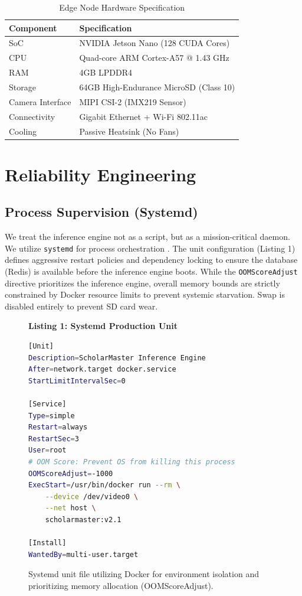 \documentclass[conference]{IEEEtran}
\begin{document}
\begin{table}[htbp]
\caption{Edge Node Hardware Specification}
\begin{center}
\begin{tabular}{ll}
\toprule
\textbf{Component} & \textbf{Specification} \\
\midrule
SoC & NVIDIA Jetson Nano (128 CUDA Cores) \\
CPU & Quad-core ARM Cortex-A57 @ 1.43 GHz \\
RAM & 4GB LPDDR4 \\
Storage & 64GB High-Endurance MicroSD (Class 10) \\
Camera Interface & MIPI CSI-2 (IMX219 Sensor) \\
Connectivity & Gigabit Ethernet + Wi-Fi 802.11ac \\
Cooling & Passive Heatsink (No Fans) \\
\bottomrule
\end{tabular}
\end{center}
\label{tab:specs}
\end{table}

\section{Reliability Engineering}

\subsection{Process Supervision (Systemd)}
We treat the inference engine not as a script, but as a mission-critical daemon. We utilize \texttt{systemd} for process orchestration \cite{b3}. The unit configuration (Listing 1) defines aggressive restart policies and dependency locking to ensure the database (Redis) is available before the inference engine boots. While the \texttt{OOMScoreAdjust} directive prioritizes the inference engine, overall memory bounds are strictly constrained by Docker resource limits to prevent systemic starvation. Swap is disabled entirely to prevent SD card wear.

\begin{figure}[htbp]
\textbf{Listing 1: Systemd Production Unit}
\begin{lstlisting}[language=bash]
[Unit]
Description=ScholarMaster Inference Engine
After=network.target docker.service
StartLimitIntervalSec=0

[Service]
Type=simple
Restart=always
RestartSec=3
User=root
# OOM Score: Prevent OS from killing this process
OOMScoreAdjust=-1000
ExecStart=/usr/bin/docker run --rm \
    --device /dev/video0 \
    --net host \
    scholarmaster:v2.1

[Install]
WantedBy=multi-user.target
\end{lstlisting}
\caption{Systemd unit file utilizing Docker for environment isolation and prioritizing memory allocation (OOMScoreAdjust).}
\label{fig:systemd}
\end{figure}
\end{document}
